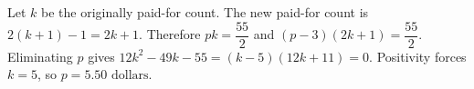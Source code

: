 Let $k$ be the originally paid-for count. The new paid-for count is $2(k+1)-1=2k+1$. Therefore $pk=\dfrac{55}{2}$ and $(p-3)(2k+1)=\dfrac{55}{2}$. Eliminating $p$ gives $12k^2-49k-55=(k-5)(12k+11)=0$. Positivity forces $k=5$, so $\boxed{p=5.50\text{ dollars}}$.
